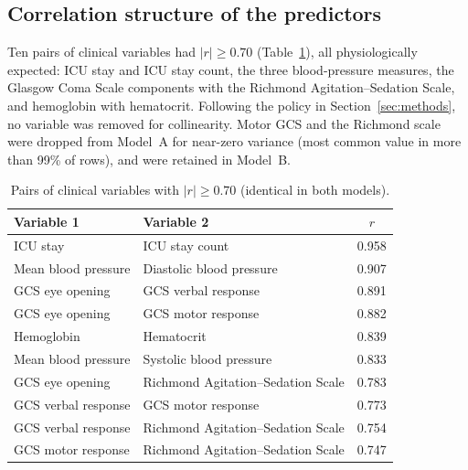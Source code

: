 \documentclass[healthcare,article,submit,pdftex,moreauthors]{Definitions/mdpi}
\begin{document}
\subsection{Correlation structure of the predictors}
Ten pairs of clinical variables had $|r|\geq 0.70$ (Table~\ref{tab:corr}), all physiologically
expected: ICU stay and ICU stay count, the three blood-pressure measures, the Glasgow Coma
Scale components with the Richmond Agitation--Sedation Scale, and hemoglobin with hematocrit.
Following the policy in Section~\ref{sec:methods}, no variable was removed for collinearity.
Motor GCS and the Richmond scale were dropped from Model~A for near-zero variance (most common
value in more than 99\% of rows), and were retained in Model~B.

\begin{table}[H]
\caption{Pairs of clinical variables with $|r|\geq 0.70$ (identical in both models).\label{tab:corr}}
\begin{tabularx}{\textwidth}{llc}
\toprule
\textbf{Variable 1} & \textbf{Variable 2} & \textbf{$r$}\\
\midrule
ICU stay & ICU stay count & 0.958\\
Mean blood pressure & Diastolic blood pressure & 0.907\\
GCS eye opening & GCS verbal response & 0.891\\
GCS eye opening & GCS motor response & 0.882\\
Hemoglobin & Hematocrit & 0.839\\
Mean blood pressure & Systolic blood pressure & 0.833\\
GCS eye opening & Richmond Agitation--Sedation Scale & 0.783\\
GCS verbal response & GCS motor response & 0.773\\
GCS verbal response & Richmond Agitation--Sedation Scale & 0.754\\
GCS motor response & Richmond Agitation--Sedation Scale & 0.747\\
\bottomrule
\end{tabularx}
\end{table}
\end{document}
